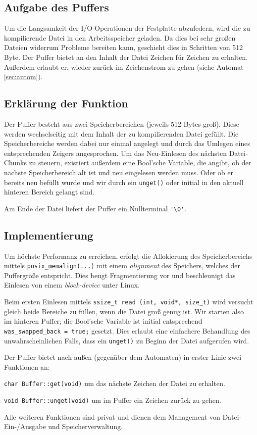 \documentclass[
a4paper,   %
11pt,      %
oneside,   %
onecolumn, %
final      %
]{article}
\newcommand{\code}[1]{\lstinline$#1$}
\begin{document}
\subsection{Aufgabe des Puffers}
Um die Langsamkeit der I/O-Operationen der Festplatte abzufedern, wird die zu kompilierende Datei in den Arbeitsspeicher geladen.
Da dies bei sehr großen Dateien widerrum Probleme bereiten kann, geschieht dies in Schritten von 512 Byte.
Der Puffer bietet an den Inhalt der Datei Zeichen für Zeichen zu erhalten.
Außerdem erlaubt er, wieder zurück im Zeichenstrom zu gehen (siehe Automat \ref{sec:autom}).

\subsection{Erklärung der Funktion}
Der Puffer besteht aus zwei Speicherbereichen (jeweils 512 Bytes groß).
Diese werden wechselseitig mit dem Inhalt der zu kompilierenden Datei gefüllt.
Die Speicherbereiche werden dabei nur einmal angelegt und durch das Umlegen eines entsprechenden Zeigers angesprochen.
Um das Neu-Einlesen des nächsten Datei-Chunks zu steuern, existiert außerdem eine Bool'sche Variable, die angibt, ob der nächste Speicherbereich alt ist und neu eingelesen werden muss.
Oder ob er bereits neu befüllt wurde und wir durch ein \code{unget()} oder initial in den aktuell hinteren Bereich gelangt sind.

Am Ende der Datei liefert der Puffer ein Nullterminal \code{'\0'}.

\subsection{Implementierung}
Um höchste Performanz zu erreichen, erfolgt die Allokierung des Speicherbereichs mittels \code{posix_memalign(...)} mit einem \emph{alignment} des Speichers, welches der Puffergröße entspricht.
Dies beugt Fragmentierung vor und beschleunigt das Einlesen von einem \emph{block-device} unter Linux.

Beim ersten Einlesen mittels \code{ssize_t read (int, void*, size_t)} wird versucht gleich beide Bereiche zu füllen, wenn die Datei groß genug ist.
Wir starten also im hinteren Puffer; die Bool'sche Variable ist initial entsprechend \code{was_swapped_back = true;} gesetzt.
Dies erlaubt eine einfachere Behandlung des unwahrscheinlichen Falls, dass ein \code{unget()} zu Beginn der Datei aufgerufen wird.

Der Puffer bietet nach außen (gegenüber dem Automaten) in erster Linie zwei Funktionen an:
\begin{description}
\item \code{char Buffer::get(void)} um das nächste Zeichen der Datei zu erhalten.
\item \code{void Buffer::unget(void)} um im Puffer ein Zeichen zurück zu gehen.
\end{description}
Alle weiteren Funktionen sind privat und dienen dem Management von Datei-Ein-/Ausgabe und Speicherverwaltung.
\end{document}
